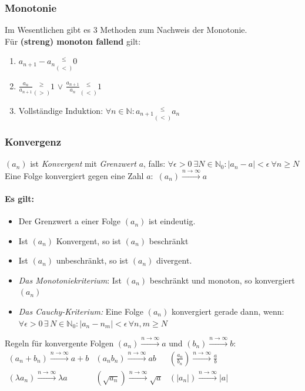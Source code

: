 \documentclass[6pt,a4paper]{scrartcl}
\newcommand{\abs}[1]{\ensuremath{\left\vert#1\right\vert}}
\begin{document}
\begin{multicols*}{4}
\subsubsection{Monotonie}
Im Wesentlichen gibt es 3 Methoden zum Nachweis der Monotonie.\\
Für \textbf{(streng) monoton fallend} gilt:
\begin{enumerate}\itemsep0pt
\item $a_{n+1} - a_n \underset{(<)}{^{\le}} 0$
\item $\frac{a_n}{a_{n+1}} \underset{(>)}{^{\ge}} 1$ \qquad $\lor$ \qquad $\frac{a_{n+1}}{a_n} \underset{(<)}{^{\le}} 1$
\item Vollständige Induktion: $\forall n \in \mathbb{N}: a_{n+1}\underset{(<)}{^{\le}} a_n$
\end{enumerate}
\subsubsection{Konvergenz}
$(a_n)$ ist \emph{Konvergent} mit \emph{Grenzwert} $a$, falls: $\forall \epsilon > 0 \ \exists N  \in \mathbb N_0:  \abs{a_n -a} < \epsilon \ \forall n \ge N$\\
Eine Folge konvergiert gegen eine Zahl $a$:\ $(a_n) \overset{n \rightarrow \infty}{\longrightarrow} a$
\paragraph{Es gilt:}
\begin{itemize}\itemsep0pt
\item Der Grenzwert a einer Folge $(a_n)$ ist eindeutig.
\item Ist $(a_n)$ Konvergent, so ist $(a_n)$ beschränkt
\item Ist $(a_n)$ unbeschränkt, so ist $(a_n)$ divergent.
\item \emph{Das Monotoniekriterium}: Ist $(a_n)$ beschränkt und monoton, so konvergiert $(a_n)$
\item \emph{Das Cauchy-Kriterium:} Eine Folge $(a_n)$ konvergiert gerade dann, wenn: \\ $\forall \epsilon >0 \, \exists \,  N \in \mathbb N_0: \abs{a_n - n_m} < \epsilon \, \forall n, m \ge N$
\end{itemize}
Regeln für konvergente Folgen $(a_n) \overset{n \rightarrow \infty}{\longrightarrow} a$ und $(b_n) \overset{n \rightarrow \infty}{\longrightarrow} b$:\\
$\begin{array}{lll}
(a_n+b_n) \overset{n \rightarrow \infty}{\longrightarrow} a+b & (a_n b_n) \overset{n \rightarrow \infty}{\longrightarrow} ab & (\frac{a_n}{b_n}) \overset{n \rightarrow \infty}{\longrightarrow} \frac{a}{b}\\
(\lambda a_n) \overset{n \rightarrow \infty}{\longrightarrow} \lambda a & (\sqrt{a_n}) \overset{n \rightarrow \infty}{\longrightarrow} \sqrt{a} & (|a_n|) \overset{n \rightarrow \infty}{\longrightarrow} |a|
\end{array}$

\end{multicols*}
\end{document}
